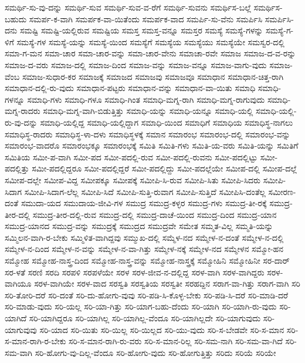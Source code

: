 {ಸಮರ್ಥಿ-ಸು-ವು-ದನ್ನು
ಸಮರ್ಥಿ-ಸುವ
ಸಮರ್ಥಿ-ಸುವ-ವ-ರೆಗೆ
ಸಮರ್ಥಿ-ಸುವನು
ಸಮರ್ಥಿಸ-ಬಲ್ಲೆ
ಸಮರ್ಥಿಸ-ಬಹುದು
ಸಮರ್ಪ-ಕ-ವಾಗಿ
ಸಮರ್ಪಕ-ವಾ-ಯಿತೆಂದು
ಸಮರ್ಪಕ-ವಾದ
ಸಮರ್ಪಿ-ಸು-ವೆನು
ಸಮರ್ಪಿಸಿ
ಸಮರ್ಪಿಸಿ-ದನು
ಸಮಷ್ಟಿ
ಸಮಷ್ಟಿ-ಯಲ್ಲಿರುವ
ಸಮಷ್ಟಿಯ
ಸಮಸ್ತ
ಸಮಸ್ತ-ವನ್ನೂ
ಸಮಸ್ತರ
ಸಮಸ್ಯೆ
ಸಮಸ್ಯೆ-ಗಳನ್ನು
ಸಮಸ್ಯೆ-ಗ-ಳಿಗೆ
ಸಮಸ್ಯೆ-ಗಳ
ಸಮಸ್ಯೆ-ಯನ್ನು
ಸಮಸ್ಯೆ-ಯಿಂದ
ಸಮಸ್ಯೆಗೆ
ಸಮಸ್ಯೆಯ
ಸಮಸ್ಯೆಯು
ಸಮಸ್ಯೆಯೇ
ಸಮಸ್ವರ-ದಲ್ಲಿ
ಸಮಾ-ಗ-ಮನ
ಸಮಾ-ಚಾರ
ಸಮಾ-ಚಾರ-ವನ್ನು
ಸಮಾ-ಚಾರ-ವೇನು
ಸಮಾಚಾ-ರವೇ
ಸಮಾಜ
ಸಮಾಜ-ದ-ವ-ರನ್ನು
ಸಮಾಜ-ದ-ವರು
ಸಮಾಜ-ದಲ್ಲಿ
ಸಮಾಜ-ದಿಂದ
ಸಮಾಜ-ವನ್ನು
ಸಮಾಜ-ವನ್ನೂ
ಸಮಾಜ-ವಾಗು-ವುದು
ಸಮಾಜ-ವೆಂಬ
ಸಮಾಜ-ಸುಧಾರ-ಕರ
ಸಮಾಜಕ್ಕೆ
ಸಮಾಜದ
ಸಮಾಜವು
ಸಮಾಜವೂ
ಸಮಾಧಾನ
ಸಮಾಧಾನ-ಚಿತ್ತ-ರಾಗಿ
ಸಮಾಧಾನ-ದಲ್ಲಿ-ರು-ವುದು
ಸಮಾಧಾನ-ಪಟ್ಟರು
ಸಮಾಧಾನ-ವನ್ನು
ಸಮಾಧಾನ-ವಾ-ಯಿತು
ಸಮಾಧಿ
ಸಮಾಧಿ-ಗಳನ್ನೂ
ಸಮಾಧಿ-ಗಳು
ಸಮಾಧಿ-ಗಳೂ
ಸಮಾಧಿ-ಗಿಂತ
ಸಮಾಧಿ-ಮಗ್ನ-ರಾಗಿ
ಸಮಾಧಿ-ಮಗ್ನ-ರಾಗುವುದು
ಸಮಾಧಿ-ಮಗ್ನ-ರಾದರು
ಸಮಾಧಿ-ಮಗ್ನ-ವಾಗಿ-ಬಿಡುತ್ತಿತ್ತು
ಸಮಾಧಿ-ಯನ್ನು
ಸಮಾಧಿ-ಯನ್ನೂ
ಸಮಾಧಿ-ಯಲ್ಲಿ
ಸಮಾಧಿ-ಯಲ್ಲಿ-ರು-ವು-ದನ್ನು
ಸಮಾಧಿ-ಯಲ್ಲಿದ್ದ
ಸಮಾಧಿ-ಯಲ್ಲಿದ್ದಾಗ
ಸಮಾಧಿ-ಯಿಂದ
ಸಮಾಧಿಗೆ
ಸಮಾಧಿಯ
ಸಮಾಧಿಸ್ಥ-ನಾಗಲು
ಸಮಾಧಿಸ್ಥ-ರಾದರು
ಸಮಾಧಿಸ್ಥ-ಳಾ-ದಳು
ಸಮಾಧಿಸ್ಥಳಕ್ಕೆ
ಸಮಾನ
ಸಮಾರಂಭ
ಸಮಾರಂಭ-ದಲ್ಲಿ
ಸಮಾರಂಭ-ವನ್ನು
ಸಮಾರಂಭ-ವಾದರೊ
ಸಮಾರಂಭಕ್ಕೂ
ಸಮಾರಂಭಕ್ಕೆ
ಸಮಿತಿ
ಸಮಿತಿ-ಗಳು
ಸಮಿತಿ-ಯ-ವರು
ಸಮಿತಿ-ಯನ್ನು
ಸಮಿತಿಗೆ
ಸಮಿತಿಯ
ಸಮೀ-ಪ-ವಾಗಿ
ಸಮೀ-ಪದ
ಸಮೀ-ಪದಲ್ಲಿ-ರುವ
ಸಮೀ-ಪದಲ್ಲಿ-ರುವನು
ಸಮೀ-ಪದಲ್ಲಿಟ್ಟು
ಸಮೀ-ಪದಲ್ಲಿತ್ತು
ಸಮೀ-ಪದಲ್ಲಿದ್ದರೂ
ಸಮೀ-ಪದಲ್ಲಿದ್ದರೆ
ಸಮೀ-ಪದಲ್ಲಿದ್ದು
ಸಮೀ-ಪದಲ್ಲೆಯೇ
ಸಮೀಪ-ದಲ್ಲಿ
ಸಮೀಪ-ದಲ್ಲೆ
ಸಮೀಪ-ದಲ್ಲೇ
ಸಮೀಪ-ವಿದ್ದ
ಸಮೀಪಕ್ಕೂ
ಸಮೀಪಕ್ಕೆ
ಸಮೀಪಿ-ಸಿ-ರುವ
ಸಮೀಪಿ-ಸಿತು
ಸಮೀಪಿ-ಸಿದರು
ಸಮೀಪಿ-ಸಿದಾಗ
ಸಮೀಪಿ-ಸಿದಾಗ-ಲೆಲ್ಲ
ಸಮೀಪಿ-ಸಿದೆ
ಸಮೀಪಿ-ಸುತ್ತಿ-ರುವಾಗ
ಸಮೀಪಿ-ಸುತ್ತಿದೆ
ಸಮೀಪಿಸಿ-ದಂತೆಲ್ಲ
ಸಮೀರಣ-ದಂತೆ
ಸಮುದಾ-ಯದ
ಸಮುದಾಯ-ಜೀವಿ-ಗಳ
ಸಮುದ್ರ
ಸಮುದ್ರ-ಕಳ್ಳರ
ಸಮುದ್ರ-ಗಳು
ಸಮುದ್ರ-ತೀ-ರಕ್ಕೆ
ಸಮುದ್ರ-ತೀರ-ದಲ್ಲಿ
ಸಮುದ್ರ-ತೀರ-ದಲ್ಲಿ-ರುವ
ಸಮುದ್ರ-ದಲ್ಲಿ
ಸಮುದ್ರ-ದಾಚೆ-ಯಿಂದ
ಸಮುದ್ರ-ದಿಂದ
ಸಮುದ್ರ-ಯಾನ
ಸಮುದ್ರ-ಯಾನದ
ಸಮುದ್ರ-ವನ್ನು
ಸಮುದ್ರಕ್ಕೆ
ಸಮುದ್ರದ
ಸಮುದ್ರವೇ
ಸಮೇತ
ಸಮ್ಮತ-ವಿಲ್ಲ
ಸಮ್ಮತಿ-ಯನ್ನು
ಸಮ್ಮಿಲನ-ವಾಗಿ-ರ-ಬೇಕು
ಸಮ್ಮಿಳಿತ-ವಾಗಿದ್ದವು
ಸಮ್ಮುಖ-ದಲ್ಲಿ
ಸಮ್ಮೆಳ-ನದ
ಸಮ್ಮೇಳ-ನ-ದಂತೆ
ಸಮ್ಮೇಳ-ನ-ದಲ್ಲಿ
ಸಮ್ಮೇಳ-ನ-ದಿಂದ
ಸಮ್ಮೇಳ-ನ-ವನ್ನು
ಸಮ್ಮೇಳ-ನ-ವಾ-ಗಿತ್ತು
ಸಮ್ಮೇಳ-ನಕ್ಕೆ
ಸಮ್ಮೇಳ-ನದ
ಸಮ್ಮೇಳನ
ಸಮ್ಮೋ-ಹನ
ಸಮ್ಮೋಹ
ಸಮ್ಮೋಹ-ನಾಸ್ತ್ರ-ದಿಂದ
ಸಮ್ಮೋಹ-ನಾಸ್ತ್ರ-ವನ್ನು
ಸಮ್ಮೋಹ-ನಾಸ್ತ್ರಕ್ಕೆ
ಸಮ್ಮೋಹಿನಿ
ಸಮ್ಮೋಹಿನೀ
ಸರ-ದಾರ್
ಸರ-ಳತೆ
ಸರಣಿ
ಸರದಿ
ಸರಪಳಿ
ಸರಪಳೆಯೇ
ಸರಳ
ಸರಳ-ಜೀವ-ನ-ದಲ್ಲಿದ್ದ
ಸರಳ-ವಾಗಿ
ಸರಳ-ವಾಗಿದ್ದರು
ಸರಳ-ವಾಗಿಯೂ
ಸರಳ-ವಾಗಿಯೇ
ಸರಳ-ವಾದ
ಸರಸ್ವತಿ
ಸರಸ್ವತಿಯ
ಸರಸ್ವತೀ
ಸರಹದ್ದಿನ
ಸರಾಗ-ವಾ-ಗಿತ್ತು
ಸರಾಗ-ವಾಗಿ
ಸರಿ
ಸರಿ-ತೋರಿ-ದರೆ
ಸರಿ-ದಂತೆ
ಸರಿ-ದು-ಹೋಗು-ವುವು
ಸರಿ-ಪಡಿ-ಸಿ-ಕೊಳ್ಳ-ಬೇಕು
ಸರಿ-ಪಡಿ-ಸಿ-ದರೆ
ಸರಿ-ಮಾಡಿ-ದರೆ
ಸರಿ-ಮಾಡು-ವುದು
ಸರಿ-ಯಲ್ಲ
ಸರಿ-ಯಾ-ಗಿತ್ತು
ಸರಿ-ಯಾಗ-ಬಹು-ದೆಂದು
ಸರಿ-ಯಾಗಿ
ಸರಿ-ಯಾಗಿ-ರು-ವುದು
ಸರಿ-ಯಾಗಿದೆ
ಸರಿ-ಯಾಗಿದ್ದರೂ
ಸರಿ-ಯಾಗಿಲ್ಲ
ಸರಿ-ಯಾಗಿಲ್ಲ-ವೆಂದೂ
ಸರಿ-ಯಾಗಿಲ್ಲದೇ
ಸರಿ-ಯಾಗುವುದು
ಸರಿ-ಯಾಗುವುವು
ಸರಿ-ಯಾದ
ಸರಿ-ಯಿತು
ಸರಿ-ಯಿಲ್ಲ
ಸರಿ-ಯಿಲ್ಲದ
ಸರಿ-ಯು-ವುದು
ಸರಿ-ಸ-ಬೇಡವೇ
ಸರಿ-ಸ-ಮಾನ
ಸರಿ-ಸ-ಮಾನ-ರಾಗಿ-ರ-ಬೇಕು
ಸರಿ-ಸ-ಮಾನ-ರಾಗಿ-ರು-ವರು
ಸರಿ-ಸ-ಮಾನ-ರಿಲ್ಲ
ಸರಿ-ಸಮ-ನಾಗಿ
ಸರಿ-ಸಮ-ವಾ-ಗಿದೆ
ಸರಿ-ಸಮ-ವಾಗಿ
ಸರಿ-ಹೋಗು-ವು-ದಿಲ್ಲ-ವೆಂದೂ
ಸರಿ-ಹೋಗು-ವುದು
ಸರಿ-ಹೋಗುತ್ತಿತ್ತು
ಸರಿದು
ಸರಿಯೆ
ಸರಿಯೇ
}
